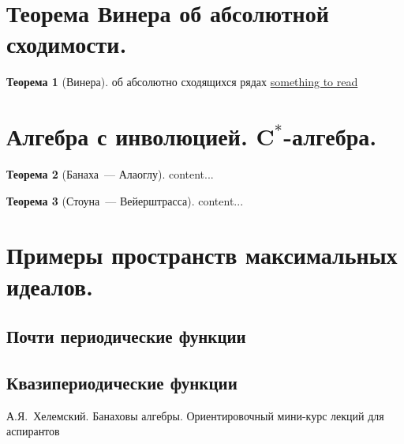 \documentclass[12pt]{extarticle}
\theoremstyle{definition}
\newtheorem{theorem}{\indent Теорема}[section]
\begin{document}
    \section[Теорема Винера.]{Теорема Винера об абсолютной сходимости.}
        \begin{theorem}[Винера]\label{th:Wiener}
            об абсолютно сходящихся рядах
            \href{https://londmathsoc.onlinelibrary.wiley.com/doi/abs/10.1112/jlms/49.3.493}{something to read}
        \end{theorem}

    \section{Алгебра с инволюцией. $\symbf{C^*}$-алгебра.}
        \begin{theorem}[Банаха~--- Алаоглу]\label{th:Alaoglu}
            content...
        \end{theorem}
        \begin{theorem}[Стоуна~--- Вейерштрасса]\label{th:StoneWrstrs}
            content...
        \end{theorem}

    \section[Примеры пространств максимальных идеалов]{Примеры пространств максимальных идеалов.}
        \subsection{Почти периодические функции}
        \subsection{Квазипериодические функции}
    \newpage
    \begin{thebibliography}{10}
        А.Я.~Хелемский. Банаховы алгебры. Ориентировочный мини-курс лекций для аспирантов
    \end{thebibliography}
\end{document}
